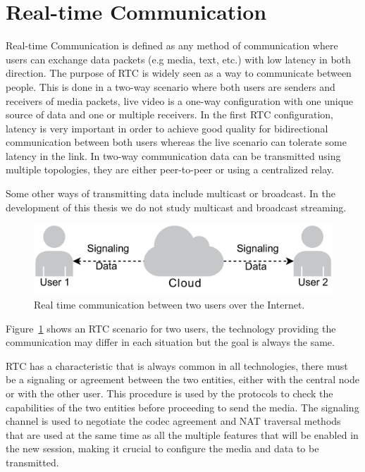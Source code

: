 \section{Real-time Communication}

\thispagestyle{empty}

Real-time Communication is defined as any method of communication where users can exchange data packets (e.g media, text, etc.) with low latency in both direction. The purpose of RTC is widely seen as a way to communicate between people. This is done in a two-way scenario where both users are senders and receivers of media packets, live video is a one-way configuration with one unique source of data and one or multiple receivers. In the first RTC configuration, latency is very important in order to achieve good quality for bidirectional communication between both users whereas the live scenario can tolerate some latency in the link. In two-way communication data can be transmitted using multiple topologies, they are either peer-to-peer or using a centralized relay. 

Some other ways of transmitting data include multicast or broadcast. In the development of this thesis we do not study multicast and broadcast streaming.

\begin{figure}[h]
  \centering
    \includegraphics[width=1\textwidth]{./figures/P2P.pdf}
      \caption[Real time communication between two users over the Internet]{Real time communication between two users over the Internet.}
	\label{fig:RTC}
\end{figure}

Figure~\ref{fig:RTC} shows an RTC scenario for two users, the technology providing the communication may differ in each situation but the goal is always the same. 

RTC has a characteristic that is always common in all technologies, there must be a signaling or agreement between the two entities, either with the central node or with the other user. This procedure is used by the protocols to check the capabilities of the two entities before proceeding to send the media. The signaling channel is used to negotiate the codec agreement and NAT traversal methods that are used at the same time as all the multiple features that will be enabled in the new session, making it crucial to configure the media and data to be transmitted.

